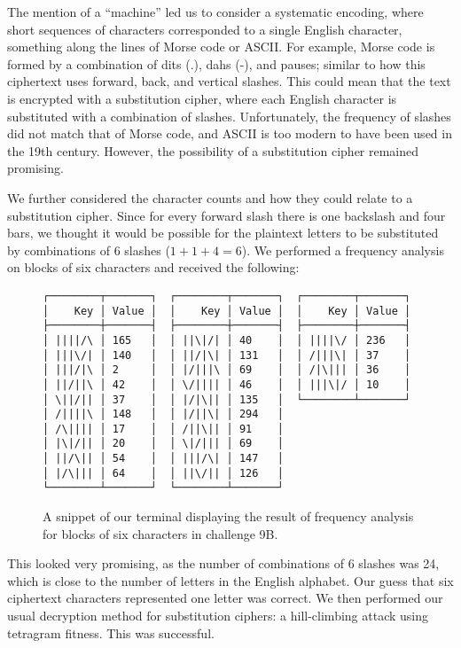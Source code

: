 The mention of a \enquote{machine} led us to consider a systematic encoding, where short sequences of characters corresponded to a single English character, something along the lines of Morse code or ASCII. For example, Morse code is formed by a combination of dits (.), dahs (-), and pauses; similar to how this ciphertext uses forward, back, and vertical slashes. This could mean that the text is encrypted with a substitution cipher, where each English character is substituted with a combination of slashes. Unfortunately, the frequency of slashes did not match that of Morse code, and ASCII is too modern to have been used in the 19th century. However, the possibility of a substitution cipher remained promising.

We further considered the character counts and how they could relate to a substitution cipher. Since for every forward slash there is one backslash and four bars, we thought it would be possible for the plaintext letters to be substituted by combinations of 6 slashes (\(1+1+4=6\)). We performed a frequency analysis on blocks of six characters and received the following:

\begin{figure}[H]
\centering
\begin{minipage}{56ex}
\begin{verbatim}        
┌────────┬───────┐  ┌────────┬───────┐  ┌────────┬───────┐
│    Key │ Value │  │    Key │ Value │  │    Key │ Value │
├────────┼───────┤  ├────────┼───────┤  ├────────┼───────┤
│ ||||/\ │ 165   │  │ ||\|/| │ 40    │  │ ||||\/ │ 236   │
│ |||\/| │ 140   │  │ ||/|\| │ 131   │  │ /|||\| │ 37    │
│ |||/|\ │ 2     │  │ |/|||\ │ 69    │  │ /|\||| │ 36    │
│ ||/||\ │ 42    │  │ \/|||| │ 46    │  │ |||\|/ │ 10    │
│ \||/|| │ 37    │  │ |/|\|| │ 135   │  └────────┴───────┘
│ /||||\ │ 148   │  │ |/||\| │ 294   │
│ /\|||| │ 17    │  │ /||\|| │ 91    │
│ |\|/|| │ 20    │  │ \|/||| │ 69    │
│ ||/\|| │ 54    │  │ |||/\| │ 147   │
│ |/\||| │ 64    │  │ ||\/|| │ 126   │
└────────┴───────┘  └────────┴───────┘
\end{verbatim}
\end{minipage}
\label{fig:char_count_9b_length6}
\caption{A snippet of our terminal displaying the result of frequency analysis for blocks of six characters in challenge 9B.}
\end{figure}

This looked very promising, as the number of combinations of 6 slashes was 24, which is close to the number of letters in the English alphabet. Our guess that six ciphertext characters represented one letter was correct. We then performed our usual decryption method for substitution ciphers: a hill-climbing attack using tetragram fitness. This was successful.

